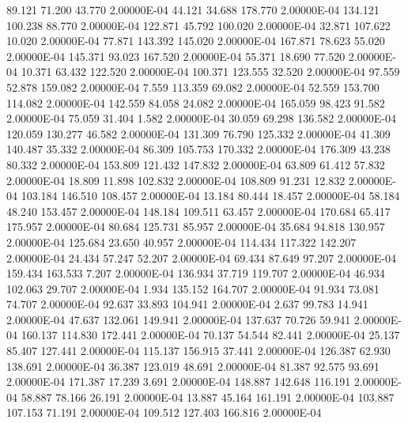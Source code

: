     89.121    71.200    43.770  2.00000E-04
    44.121    34.688   178.770  2.00000E-04
   134.121   100.238    88.770  2.00000E-04
   122.871    45.792   100.020  2.00000E-04
    32.871   107.622    10.020  2.00000E-04
    77.871   143.392   145.020  2.00000E-04
   167.871    78.623    55.020  2.00000E-04
   145.371    93.023   167.520  2.00000E-04
    55.371    18.690    77.520  2.00000E-04
    10.371    63.432   122.520  2.00000E-04
   100.371   123.555    32.520  2.00000E-04
    97.559    52.878   159.082  2.00000E-04
     7.559   113.359    69.082  2.00000E-04
    52.559   153.700   114.082  2.00000E-04
   142.559    84.058    24.082  2.00000E-04
   165.059    98.423    91.582  2.00000E-04
    75.059    31.404     1.582  2.00000E-04
    30.059    69.298   136.582  2.00000E-04
   120.059   130.277    46.582  2.00000E-04
   131.309    76.790   125.332  2.00000E-04
    41.309   140.487    35.332  2.00000E-04
    86.309   105.753   170.332  2.00000E-04
   176.309    43.238    80.332  2.00000E-04
   153.809   121.432   147.832  2.00000E-04
    63.809    61.412    57.832  2.00000E-04
    18.809    11.898   102.832  2.00000E-04
   108.809    91.231    12.832  2.00000E-04
   103.184   146.510   108.457  2.00000E-04
    13.184    80.444    18.457  2.00000E-04
    58.184    48.240   153.457  2.00000E-04
   148.184   109.511    63.457  2.00000E-04
   170.684    65.417   175.957  2.00000E-04
    80.684   125.731    85.957  2.00000E-04
    35.684    94.818   130.957  2.00000E-04
   125.684    23.650    40.957  2.00000E-04
   114.434   117.322   142.207  2.00000E-04
    24.434    57.247    52.207  2.00000E-04
    69.434    87.649    97.207  2.00000E-04
   159.434   163.533     7.207  2.00000E-04
   136.934    37.719   119.707  2.00000E-04
    46.934   102.063    29.707  2.00000E-04
     1.934   135.152   164.707  2.00000E-04
    91.934    73.081    74.707  2.00000E-04
    92.637    33.893   104.941  2.00000E-04
     2.637    99.783    14.941  2.00000E-04
    47.637   132.061   149.941  2.00000E-04
   137.637    70.726    59.941  2.00000E-04
   160.137   114.830   172.441  2.00000E-04
    70.137    54.544    82.441  2.00000E-04
    25.137    85.407   127.441  2.00000E-04
   115.137   156.915    37.441  2.00000E-04
   126.387    62.930   138.691  2.00000E-04
    36.387   123.019    48.691  2.00000E-04
    81.387    92.575    93.691  2.00000E-04
   171.387    17.239     3.691  2.00000E-04
   148.887   142.648   116.191  2.00000E-04
    58.887    78.166    26.191  2.00000E-04
    13.887    45.164   161.191  2.00000E-04
   103.887   107.153    71.191  2.00000E-04
   109.512   127.403   166.816  2.00000E-04
